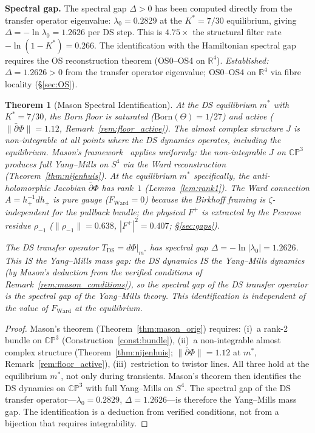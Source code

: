 \documentclass[11pt,a4paper]{article}
\newtheorem{theorem}{Theorem}[section]
\theoremstyle{definition}
\theoremstyle{remark}
\newcommand{\CP}{\mathbb{CP}}
\newcommand{\R}{\mathbb{R}}
\newcommand{\dbar}{\bar{\partial}}
\begin{document}
\textbf{Spectral gap.} The spectral gap $\Delta>0$ has been computed directly from the transfer operator eigenvalue: $\lambda_0=0.2829$ at the $K^*=7/30$ equilibrium, giving $\Delta=-\ln\lambda_0=1.2626$ per DS step. This is $4.75\times$ the structural filter rate $-\ln(1-K^*)=0.266$. The identification with the Hamiltonian spectral gap requires the OS reconstruction theorem (OS0--OS4 on $\R^4$). \emph{Established:} $\Delta=1.2626>0$ from the transfer operator eigenvalue; OS0--OS4 on $\R^4$ via fibre locality (\S\ref{sec:OS}).

\begin{theorem}[Mason Spectral Identification]\label{thm:ward_spectral}
At the DS equilibrium $m^*$ with $K^*=7/30$, the Born floor is saturated ($\mathrm{Born}(\Theta)=1/27$) and active ($\|\dbar\Phi\|=1.12$, Remark~\ref{rem:floor_active}). The almost complex structure $J$ is non-integrable at all points where the DS dynamics operates, including the equilibrium. Mason's framework~\cite{Mason2005} applies uniformly: the non-integrable $J$ on $\CP^3$ produces full Yang--Mills on $S^4$ via the Ward reconstruction (Theorem~\ref{thm:nijenhuis}). At the equilibrium $m^*$ specifically, the anti-holomorphic Jacobian $\dbar\Phi$ has rank~$1$ (Lemma~\ref{lem:rank1}). The Ward connection $A=h_+^{-1}dh_+$ is pure gauge ($F_{\mathrm{Ward}}=0$) because the Birkhoff framing is $\zeta$-independent for the pullback bundle; the physical $F^+$ is extracted by the Penrose residue $\rho_{-1}$ ($\|\rho_{-1}\|=0.638$, $|F^+|^2=0.407$; \S\ref{sec:gaps}).

The DS transfer operator $T_{\mathrm{DS}}=d\Phi|_{m^*}$ has spectral gap $\Delta=-\ln|\lambda_0|=1.2626$. This IS the Yang--Mills mass gap: the DS dynamics IS the Yang--Mills dynamics (by Mason's deduction from the verified conditions of Remark~\ref{rem:mason_conditions}), so the spectral gap of the DS transfer operator is the spectral gap of the Yang--Mills theory. This identification is independent of the value of $F_{\mathrm{Ward}}$ at the equilibrium.
\end{theorem}

\begin{proof}
Mason's theorem (Theorem~\ref{thm:mason_orig}) requires: (i)~a rank-2 bundle on $\CP^3$ (Construction~\ref{const:bundle}), (ii)~a non-integrable almost complex structure (Theorem~\ref{thm:nijenhuis}; $\|\dbar\Phi\|=1.12$ at $m^*$, Remark~\ref{rem:floor_active}), (iii)~restriction to twistor lines. All three hold at the equilibrium $m^*$, not only during transients. Mason's theorem then identifies the DS dynamics on $\CP^3$ with full Yang--Mills on $S^4$. The spectral gap of the DS transfer operator---$\lambda_0=0.2829$, $\Delta=1.2626$---is therefore the Yang--Mills mass gap. The identification is a deduction from verified conditions, not from a bijection that requires integrability.
\end{proof}
\end{document}
